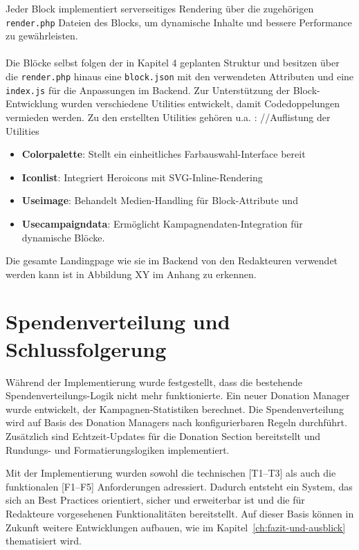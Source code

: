 Jeder Block implementiert serverseitiges Rendering über die zugehörigen \texttt{render.php} Dateien des Blocks, um dynamische Inhalte und bessere Performance zu gewährleisten.\\\\
Die Blöcke selbst folgen der in Kapitel 4 geplanten Struktur und besitzen über die \texttt{render.php} hinaus eine \texttt{block.json} mit den verwendeten Attributen und eine \texttt{index.js} für die Anpassungen im Backend.
Zur Unterstützung der Block-Entwicklung wurden verschiedene Utilities entwickelt, damit Codedoppelungen vermieden werden.
Zu den erstellten Utilities gehören u.a. :
//Auflistung der Utilities
\begin{itemize}
    \item \textbf{Colorpalette}: Stellt ein einheitliches Farbauswahl-Interface bereit
    \item \textbf{Iconlist}: Integriert Heroicons mit SVG-Inline-Rendering
    \item \textbf{Useimage}: Behandelt Medien-Handling für Block-Attribute und
    \item \textbf{Usecampaigndata}:  Ermöglicht Kampagnendaten-Integration für dynamische Blöcke.
\end{itemize}
Die gesamte Landingpage wie sie im Backend von den Redakteuren verwendet werden kann ist in Abbildung XY im Anhang zu erkennen. %

\section{Spendenverteilung und Schlussfolgerung}
Während der Implementierung wurde festgestellt, dass die bestehende Spendenverteilungs-Logik nicht mehr funktionierte.
Ein neuer Donation Manager wurde entwickelt, der Kampagnen-Statistiken berechnet.
Die Spendenverteilung wird auf Basis des Donation Managers nach konfigurierbaren Regeln durchführt.
Zusätzlich sind Echtzeit-Updates für die Donation Section bereitstellt und Rundungs- und Formatierungslogiken implementiert.

Mit der Implementierung wurden sowohl die technischen [T1–T3] als auch die funktionalen [F1–F5] Anforderungen adressiert.
Dadurch entsteht ein System, das sich an Best Practices orientiert, sicher und erweiterbar ist und die für Redakteure vorgesehenen Funktionalitäten bereitstellt.
Auf dieser Basis können in Zukunft weitere Entwicklungen aufbauen, wie im Kapitel~\ref{ch:fazit-und-ausblick} thematisiert wird.
